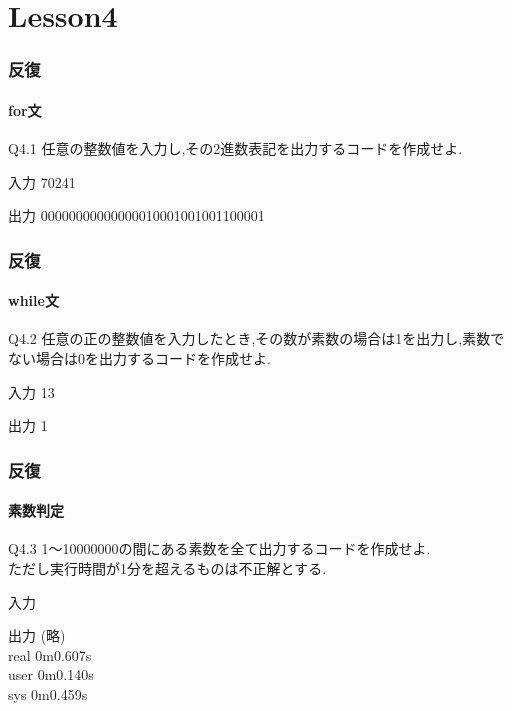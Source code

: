 \documentclass[dvipdfmx]{beamer}
\begin{document}
\section{Lesson4}
\begin{frame}
    \frametitle{反復}
    \framesubtitle{for文}
	\begin{itembox}[l]{Q4.1}
        任意の整数値を入力し,その2進数表記を出力するコードを作成せよ.
	\end{itembox}
	\begin{block}{入力}
        70241
	\end{block}
	\begin{block}{出力}
        00000000000000010001001001100001
	\end{block}
\end{frame}

\begin{frame}
    \frametitle{反復}
    \framesubtitle{while文}
	\begin{itembox}[l]{Q4.2}
        任意の正の整数値を入力したとき,その数が素数の場合は1を出力し,素数でない場合は0を出力するコードを作成せよ.
	\end{itembox}
	\begin{block}{入力}
        13
	\end{block}
	\begin{block}{出力}
        1
	\end{block}
\end{frame}

\begin{frame}
    \frametitle{反復}
    \framesubtitle{素数判定}
	\begin{itembox}[l]{Q4.3}
        1～10000000の間にある素数を全て出力するコードを作成せよ.\\
        ただし実行時間が1分を超えるものは不正解とする.
	\end{itembox}
	\begin{block}{入力}
	\end{block}
	\begin{block}{出力}
        (略)\\
        real    0m0.607s\\
        user    0m0.140s\\
        sys     0m0.459s
	\end{block}
\end{frame}
\end{document}

